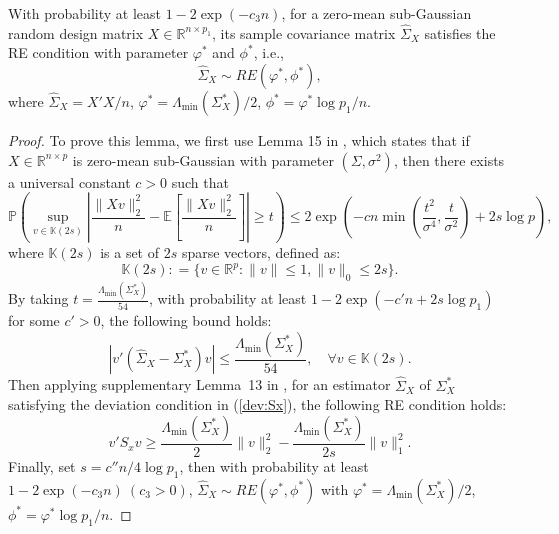 \begin{lemma}\label{lemma:RESX}
With probability at least $1-2\exp(-c_3n)$, for a zero-mean sub-Gaussian random design matrix $X\in\mathbb{R}^{n\times p_1}$, its sample covariance matrix $\widehat{\Sigma}_X$ satisfies the RE condition with parameter $\varphi^*$ and $\phi^*$, i.e.,
\begin{equation}
\widehat{\Sigma}_X\sim RE(\varphi^*,\phi^*),
\end{equation}
where $\widehat{\Sigma}_X=X'X/n$, $\varphi^*=\Lambda_{\min}(\Sigma^*_X)/2$, $\phi^*=\varphi^* \log p_1/n$.
\end{lemma}
\begin{proof}
To prove this lemma, we first use Lemma 15 in \citet{loh2011high}, which states that if $X\in\mathbb{R}^{n\times p}$ is  zero-mean sub-Gaussian with parameter $(\Sigma,\sigma^2)$, then there exists a universal constant $c>0$ such that 
\begin{equation}
\mathbb{P}\left( \sup_{v\in\mathbb{K}(2s)}\left| \frac{\|Xv\|_2^2}{n} - \mathbb{E}\left[ \frac{\|Xv\|_2^2}{n}\right] \right| \geq t\right) \leq 2\exp\left( -cn \min(\frac{t^2}{\sigma^4},\frac{t}{\sigma^2})+ 2s\log p\right),
\end{equation}
where $\mathbb{K}(2s)$ is a set of $2s$ sparse vectors, defined as:
\begin{equation*}
\mathbb{K}(2s) : = \{v\in\mathbb{R}^p:\|v\|\leq 1,\|v\|_0\leq 2s\}.
\end{equation*}
By taking $t=\frac{\Lambda_{\min}(\Sigma^*_X)}{54}$, with probability at least $1-2\exp\left(-c'n + 2s\log p_1\right)$ for some $c'>0$, the following bound holds:
\begin{equation}\label{dev:Sx}
|v' (\widehat{\Sigma}_X-\Sigma^*_X) v | \leq \frac{\Lambda_{\min}(\Sigma^*_X)}{54}, \quad \forall v\in \mathbb{K}(2s).
\end{equation}
Then applying supplementary Lemma~13 in \citet{loh2011high}, for an estimator $\widehat{\Sigma}_X$ of $\Sigma^*_X$ satisfying the deviation condition in (\ref{dev:Sx}), the following RE condition holds:
\begin{equation*}
v'S_xv \geq \frac{\Lambda_{\min}(\Sigma^*_X)}{2}\|v\|_2^2 - \frac{\Lambda_{\min}(\Sigma^*_X)}{2s}\|v\|_1^2.
\end{equation*}
Finally, set $s=c''n/4\log p_1$, then with probability at least $1-2\exp(-c_3n)~(c_3>0)$, $\widehat{\Sigma}_X\sim RE(\varphi^*,\phi^*)$ with $\varphi^*=\Lambda_{\min}(\Sigma^*_X)/2$, $\phi^*= \varphi^*\log p_1/n$. 
\end{proof}

